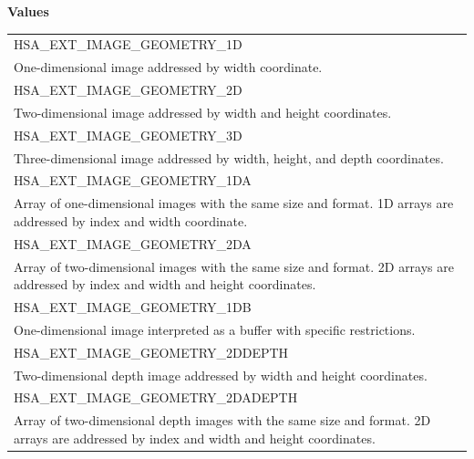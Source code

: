 \documentclass[final,oneside]{book}
\newcommand{\reftyp}[1]{#1}
\newcommand{\refenu}[1]{\reftyp{#1}}
\begin{document}
\noindent\textbf{Values}\\[-5mm]
\begin{longtable}{@{\hspace{2em}}p{\linewidth-2em}}
\hspace{-2em}\refenu{HSA_\-EXT_\-IMAGE_\-GEOMETRY_\-1D}\\One-dimensional image addressed by width coordinate.\\[2mm]
\hspace{-2em}\refenu{HSA_\-EXT_\-IMAGE_\-GEOMETRY_\-2D}\\Two-dimensional image addressed by width and height coordinates.\\[2mm]
\hspace{-2em}\refenu{HSA_\-EXT_\-IMAGE_\-GEOMETRY_\-3D}\\Three-dimensional image addressed by width, height, and depth coordinates.\\[2mm]
\hspace{-2em}\refenu{HSA_\-EXT_\-IMAGE_\-GEOMETRY_\-1DA}\\Array of one-dimensional images with the same size and format. 1D arrays are addressed by index and width coordinate.\\[2mm]
\hspace{-2em}\refenu{HSA_\-EXT_\-IMAGE_\-GEOMETRY_\-2DA}\\Array of two-dimensional images with the same size and format. 2D arrays are addressed by index and width and height coordinates.\\[2mm]
\hspace{-2em}\refenu{HSA_\-EXT_\-IMAGE_\-GEOMETRY_\-1DB}\\One-dimensional image interpreted as a buffer with specific restrictions.\\[2mm]
\hspace{-2em}\refenu{HSA_\-EXT_\-IMAGE_\-GEOMETRY_\-2DDEPTH}\\Two-dimensional depth image addressed by width and height coordinates.\\[2mm]
\hspace{-2em}\refenu{HSA_\-EXT_\-IMAGE_\-GEOMETRY_\-2DADEPTH}\\Array of two-dimensional depth images with the same size and format. 2D arrays are addressed by index and width and height coordinates.
\end{longtable}
\end{document}
